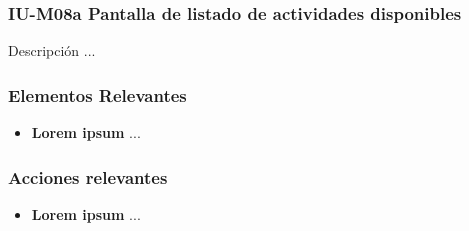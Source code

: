 
\subsubsection{IU-M08a Pantalla de listado de actividades disponibles}

 Descripción ...


\subsubsection{Elementos Relevantes}

    \begin{itemize}
    \item {\bf Lorem ipsum}
        ...
    \end{itemize}

\subsubsection{Acciones relevantes}

    \begin{itemize}
    \item {\bf Lorem ipsum}
        ...
    \end{itemize}

\clearpage
